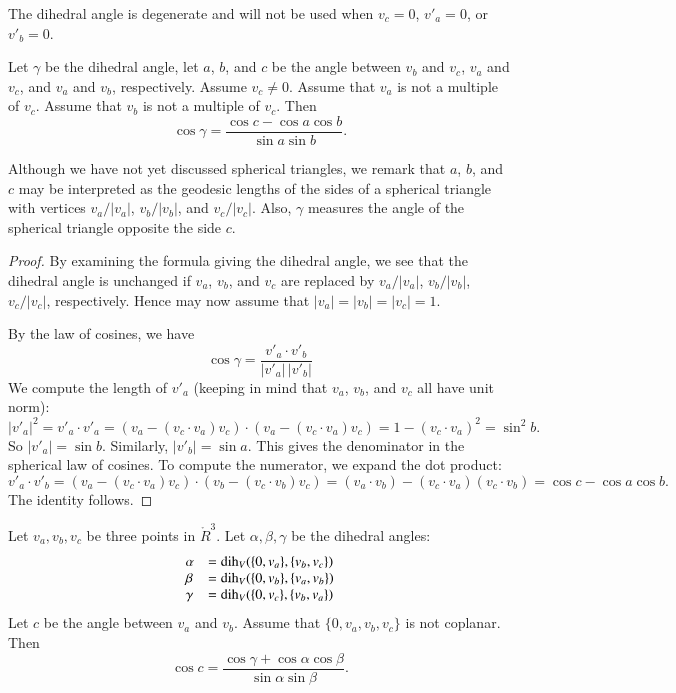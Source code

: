 The dihedral angle is degenerate and will not be used when $v_c =
0$, $v'_a = 0$, or $v'_b = 0$.



\begin{lemma}
Let $\gamma$ be the dihedral angle,  let $a$, $b$, and $c$ be the
angle between $v_b$ and $v_c$, $v_a$ and $v_c$, and $v_a$ and
$v_b$, respectively. Assume $v_c\ne 0$.  Assume that $v_a$ is not
a multiple of $v_c$. Assume that $v_b$ is not a multiple of $v_c$.
Then
    $$\cos\gamma = \frac{\cos c - \cos a \cos b}{\sin a\sin b}.$$
\end{lemma}

\begin{remark}  Although we have not yet discussed spherical
triangles, we remark that $a$, $b$, and $c$ may be interpreted as
the geodesic lengths of the sides of a spherical triangle with
vertices $v_a/|v_a|$, $v_b/|v_b|$, and $v_c/|v_c|$. Also,
$\gamma$ measures the angle of the spherical triangle opposite the
side $c$.
\end{remark}

\begin{proof}
By examining the formula giving the dihedral angle, we see that the
dihedral angle is unchanged if $v_a$, $v_b$, and $v_c$ are replaced
by $v_a/|v_a|$, $v_b/|v_b|$, $v_c/|v_c|$, respectively.  Hence
may now assume that $|v_a|=|v_b|=|v_c|=1$.

By the law of cosines, we have
        $$\cos\gamma = \frac{v'_a\cdot v'_b}{|v'_a|\,|v'_b|}$$
We compute the length of $v'_a$ (keeping in mind that $v_a$, $v_b$,
and $v_c$ all have unit norm):
        $$
        |v'_a|^2 = v'_a\cdot v'_a =
        (v_a - (v_c\cdot v_a)v_c)\cdot (v_a - (v_c\cdot v_a) v_c) =
        1 - (v_c\cdot v_a)^2 = \sin^2 b.
        $$
So $|v'_a| =\sin b$. Similarly, $|v'_b| = \sin a$.  This gives
the denominator in the spherical law of cosines. To compute the
numerator, we expand the dot product:
    $$
    v'_a\cdot v'_b = (v_a - (v_c\cdot v_a) v_c)\cdot (v_b - (v_c\cdot v_b) v_c)
    = (v_a\cdot v_b) - (v_c\cdot v_a) (v_c\cdot v_b) = \cos c - \cos
    a \cos b.
    $$
The identity follows.
\end{proof}

\begin{lemma}
Let $v_a,v_b,v_c$ be three points in $\ring{R}^3$.
Let $\alpha,\beta,\gamma$ be the dihedral angles: 
   $$
   \begin{array}{lll}
     \alpha &= \operatorname{dih}_V(\{0,v_a\},\{v_b,v_c\})\\
     \beta &= \operatorname{dih}_V(\{0,v_b\},\{v_a,v_b\})\\
     \gamma&= \operatorname{dih}_V(\{0,v_c\},\{v_b,v_a\})\\
     \end{array}
   $$
Let $c$ be the
angle between $v_a$ and $v_b$. 
Assume that $\{0,v_a,v_b,v_c\}$ is not coplanar.
Then
    $$
    \cos c = \frac{\cos \gamma + \cos \alpha \cos \beta}
     {\sin \alpha\sin \beta}.
    $$
\end{lemma}

